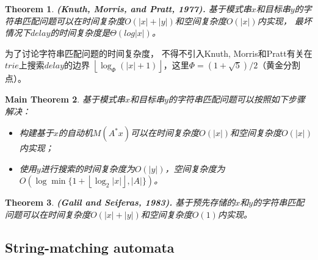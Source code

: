 \documentclass[UTF8]{ctexart}
\newtheorem{thm}{Theorem}[subsection]
\newtheorem{mthm}[thm]{Main Theorem}
\theoremstyle{definition}
\theoremstyle{remark}
\numberwithin{equation}{subsection}
\newcommand\Emph{\textbf}
\begin{document}
	\begin{thm}
		\Emph{(Knuth, Morris, and Pratt, 1977).}
		基于模式串$x$和目标串$y$的字符串匹配问题可以在时间复杂度$O(|x|+|y|)$和空间复杂度$O(|x|)$内实现，
		最坏情况下$delay$的时间复杂度是$\Theta(log|x|)$。
	\end{thm}
	为了讨论字符串匹配问题的时间复杂度，
	不得不引入Knuth, Morris和Pratt有关在$trie$上搜索$delay$的边界
	$\left\lfloor \log_\Phi(|x|+1) \right\rfloor$，这里$\Phi = (1+\sqrt5)/2$（黄金分割点）。
	
	\begin{mthm}
		基于模式串$x$和目标串$y$的字符串匹配问题可以按照如下步骤解决：
		\begin{itemize}
			\item 构建基于$x$的自动机$M(A^*x)$可以在时间复杂度$O(|x|)$和空间复杂度$O(|x|)$内实现；
			\item 使用$y$进行搜索的时间复杂度为$O(|y|)$，空间复杂度为$O(\log \min \{ 1+\left\lfloor \log_2|x| \right\rfloor, |A| \})$。
		\end{itemize}
	\end{mthm}
	\begin{thm}
		\Emph{(Galil and Seiferas, 1983).}
		基于预先存储的$x$和$y$的字符串匹配问题可以在时间复杂度$O(|x|+|y|)$和空间复杂度$O(1)$内实现。
	\end{thm}
	
\subsection{String-matching automata}
\end{document}

